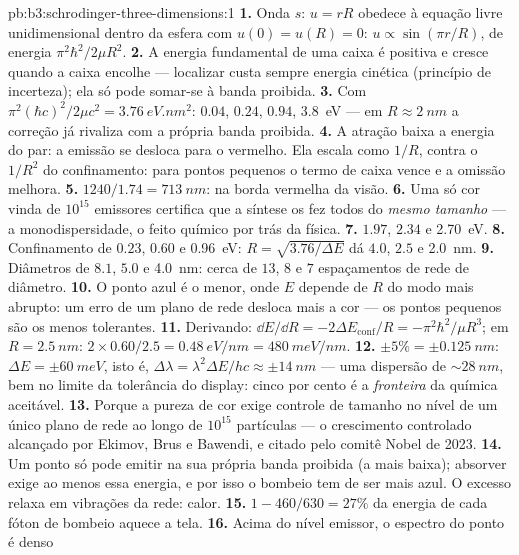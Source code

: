 \begin{solution}{pb:b3:schrodinger-three-dimensions:1}
\textbf{1.} Onda $s$: $u = rR$ obedece à equação livre unidimensional
dentro da esfera com $u(0) = u(R) = 0$: $u \propto \sin(\pi r/R)$, de
energia $\pi^2\hbar^2/2\mu R^2$.
\textbf{2.} A energia fundamental de uma caixa é positiva e cresce
quando a caixa encolhe --- localizar custa sempre energia cinética
(princípio de incerteza); ela só pode somar-se à banda proibida.
\textbf{3.} Com $\pi^2(\hbar c)^2/2\mu c^2 = \qty{3.76}{eV.nm^2}$:
$0.04$, $0.24$, $0.94$, \qty{3.8}{eV} --- em $R \approx \qty{2}{nm}$ a
correção já rivaliza com a própria banda proibida.
\textbf{4.} A atração baixa a energia do par: a emissão se desloca para
o vermelho. Ela escala como $1/R$, contra o $1/R^2$ do confinamento:
para pontos pequenos o termo de caixa vence e a omissão melhora.
\textbf{5.} $1240/1.74 = \qty{713}{nm}$: na borda vermelha da visão.
\textbf{6.} Uma só cor vinda de $10^{15}$ emissores certifica que a
síntese os fez todos do \emph{mesmo tamanho} --- a monodispersidade, o
feito químico por trás da física.
\textbf{7.} $1.97$, $2.34$ e \qty{2.70}{eV}.
\textbf{8.} Confinamento de $0.23$, $0.60$ e \qty{0.96}{eV}: $R =
\sqrt{3.76/\Delta E}$ dá $4.0$, $2.5$ e \qty{2.0}{nm}.
\textbf{9.} Diâmetros de $8.1$, $5.0$ e \qty{4.0}{nm}: cerca de $13$,
$8$ e $7$ espaçamentos de rede de diâmetro.
\textbf{10.} O ponto azul é o menor, onde $E$ depende de $R$ do modo
mais abrupto: um erro de um plano de rede desloca mais a cor --- os
pontos pequenos são os menos tolerantes.
\textbf{11.} Derivando: $\dd E/\dd R = -2\Delta E_{\text{conf}}/R
= -\pi^2\hbar^2/\mu R^3$; em $R = \qty{2.5}{nm}$: $2 \times 0.60/2.5
= \qty{0.48}{eV/nm} = \qty{480}{meV/nm}$.
\textbf{12.} $\pm 5\% = \pm\qty{0.125}{nm}$: $\Delta E = \pm
\qty{60}{meV}$, isto é, $\Delta\lambda = \lambda^2\Delta E/hc \approx
\pm\qty{14}{nm}$ --- uma dispersão de $\sim\qty{28}{nm}$, bem no limite
da tolerância do display: cinco por cento é a \emph{fronteira} da
química aceitável.
\textbf{13.} Porque a pureza de cor exige controle de tamanho no nível
de um único plano de rede ao longo de $10^{15}$ partículas --- o
crescimento controlado alcançado por Ekimov, Brus e Bawendi, e citado
pelo comitê Nobel de 2023.
\textbf{14.} Um ponto só pode emitir na sua própria banda proibida (a
mais baixa); absorver exige ao menos essa energia, e por isso o bombeio
tem de ser mais azul. O excesso relaxa em vibrações da rede: calor.
\textbf{15.} $1 - 460/630 = 27\%$ da energia de cada fóton de bombeio
aquece a tela.
\textbf{16.} Acima do nível emissor, o espectro do ponto é denso

\end{solution}
